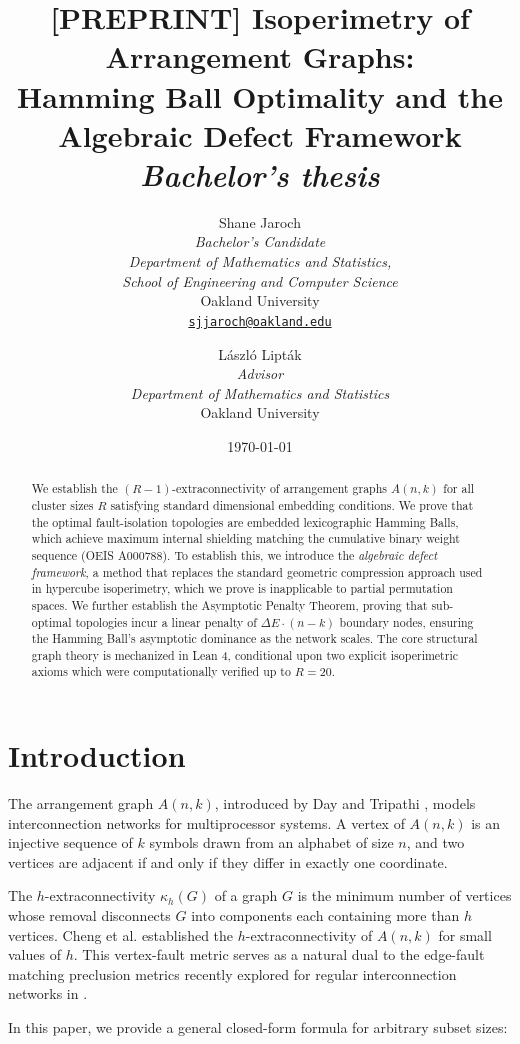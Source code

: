 \documentclass[11pt, letterpaper]{article}
\title{%
  \textbf{[PREPRINT] Isoperimetry of Arrangement Graphs:}\\
  Hamming Ball Optimality and the Algebraic Defect Framework\\[0.5em]
  \large \textit{Bachelor's thesis}
}
\author{
  Shane Jaroch \\
  \small \textit{Bachelor's Candidate} \\
  \small \textit{Department of Mathematics and Statistics,} \\
  \small \textit{School of Engineering and Computer Science} \\
  \small Oakland University \\
  \small \href{mailto:sjjaroch@oakland.edu}{\texttt{sjjaroch@oakland.edu}}
  \and
  L\'{a}szl\'{o} Lipt\'{a}k \\
  \small \textit{Advisor} \\
  \small \textit{Department of Mathematics and Statistics} \\
  \small Oakland University
}
\date{\today}
\theoremstyle{definition}
\theoremstyle{remark}
\begin{document}
\maketitle

\begin{abstract}
We establish the $(R-1)$-extraconnectivity of arrangement graphs $A(n,k)$ for all cluster sizes $R$ satisfying standard dimensional embedding conditions. We prove that the optimal fault-isolation topologies are embedded lexicographic Hamming Balls, which achieve maximum internal shielding matching the cumulative binary weight sequence (OEIS A000788). To establish this, we introduce the \emph{algebraic defect framework}, a method that replaces the standard geometric compression approach used in hypercube isoperimetry, which we prove is inapplicable to partial permutation spaces. We further establish the Asymptotic Penalty Theorem, proving that sub-optimal topologies incur a linear penalty of $\Delta E \cdot (n-k)$ boundary nodes, ensuring the Hamming Ball's asymptotic dominance as the network scales. The core structural graph theory is mechanized in Lean 4, conditional upon two explicit isoperimetric axioms which were computationally verified up to $R=20$.
\end{abstract}

\section{Introduction}

The arrangement graph $A(n,k)$, introduced by Day and Tripathi \cite{day1992arrangement}, models interconnection networks for multiprocessor systems. A vertex of $A(n,k)$ is an injective sequence of $k$ symbols drawn from an alphabet of size $n$, and two vertices are adjacent if and only if they differ in exactly one coordinate.

The $h$-extraconnectivity $\kappa_h(G)$ of a graph $G$ is the minimum number of vertices whose removal disconnects $G$ into components each containing more than $h$ vertices. Cheng et al. \cite{cheng2022extraconnectivity} established the $h$-extraconnectivity of $A(n,k)$ for small values of $h$. This vertex-fault metric serves as a natural dual to the edge-fault matching preclusion metrics recently explored for regular interconnection networks in \cite{cheng2025higher}.

In this paper, we provide a general closed-form formula for arbitrary subset sizes:
\end{document}
